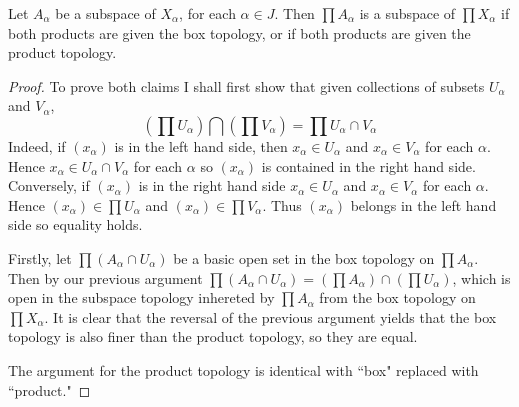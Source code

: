 \documentclass[12pt, a4paper, oneside, openright, titlepage]{book}
\begin{document}
\begin{thm}
    Let $A_{\alpha}$ be a subspace of $X_{\alpha}$, for each $\alpha \in J$. Then $\prod A_{\alpha}$ is a subspace of $\prod X_{\alpha}$ if both products are given the box topology, or if both products are given the product topology.
\end{thm}
\begin{proof}
    To prove both claims I shall first show that given collections of subsets $U_{\alpha}$ and $V_{\alpha}$, \begin{equation*}
        \left(\prod U_{\alpha}\right)\bigcap\left(\prod V_{\alpha}\right) = \prod U_{\alpha}\cap V_{\alpha}
    \end{equation*}
    Indeed, if $(x_{\alpha})$ is in the left hand side, then $x_{\alpha} \in U_{\alpha}$ and $x_{\alpha} \in V_{\alpha}$ for each $\alpha$. Hence $x_{\alpha} \in U_{\alpha}\cap V_{\alpha}$ for each $\alpha$ so $(x_{\alpha})$ is contained in the right hand side. Conversely, if $(x_{\alpha})$ is in the right hand side $x_{\alpha} \in U_{\alpha}$ and $x_{\alpha} \in V_{\alpha}$ for each $\alpha$. Hence $(x_{\alpha}) \in \prod U_{\alpha}$ and $(x_{\alpha}) \in \prod V_{\alpha}$. Thus $(x_{\alpha})$ belongs in the left hand side so equality holds.

    Firstly, let $\prod (A_{\alpha}\cap U_{\alpha})$ be a basic open set in the box topology on $\prod A_{\alpha}$. Then by our previous argument $\prod (A_{\alpha}\cap U_{\alpha}) = \left(\prod A_{\alpha}\right)\cap\left(\prod U_{\alpha}\right)$, which is open in the subspace topology inhereted by $\prod A_{\alpha}$ from the box topology on $\prod X_{\alpha}$. It is clear that the reversal of the previous argument yields that the box topology is also finer than the product topology, so they are equal.

    The argument for the product topology is identical with ``box" replaced with ``product."
\end{proof}
\end{document}

